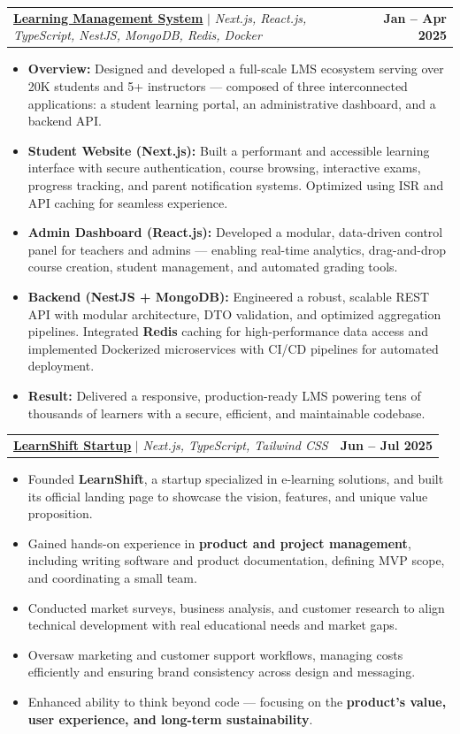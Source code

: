 \documentclass[letterpaper,11pt]{article}
\makeatletter
\newcommand{\resumeItem}[1]{
  \item\small{
    {#1 \vspace{-2pt}}
  }
}
\newcommand{\resumeProjectHeading}[2]{
    \item
    \begin{tabular*}{1.001\textwidth}{l@{\extracolsep{\fill}}r}
      \small#1 & \textbf{\small #2}\\
    \end{tabular*}\vspace{-7pt}
}
\newcommand{\resumeItemListStart}{\begin{itemize}}
\newcommand{\resumeItemListEnd}{\end{itemize}\vspace{-5pt}}
\makeatother
\begin{document}
\resumeProjectHeading
  {\href{https://heba-elsayed.com}{\underline{\textbf{Learning Management System}}} $|$ \emph{Next.js, React.js, TypeScript, NestJS, MongoDB, Redis, Docker}}{Jan -- Apr 2025}
  \resumeItemListStart
    \resumeItem{\textbf{Overview:} Designed and developed a full-scale LMS ecosystem serving over 20K students and 5+ instructors — composed of three interconnected applications: a student learning portal, an administrative dashboard, and a backend API.}
    \resumeItem{\textbf{Student Website (Next.js):} Built a performant and accessible learning interface with secure authentication, course browsing, interactive exams, progress tracking, and parent notification systems. Optimized using ISR and API caching for seamless experience.}
    \resumeItem{\textbf{Admin Dashboard (React.js):} Developed a modular, data-driven control panel for teachers and admins — enabling real-time analytics, drag-and-drop course creation, student management, and automated grading tools.}
    \resumeItem{\textbf{Backend (NestJS + MongoDB):} Engineered a robust, scalable REST API with modular architecture, DTO validation, and optimized aggregation pipelines. Integrated \textbf{Redis} caching for high-performance data access and implemented Dockerized microservices with CI/CD pipelines for automated deployment.}
    \resumeItem{\textbf{Result:} Delivered a responsive, production-ready LMS powering tens of thousands of learners with a secure, efficient, and maintainable codebase.}
  \resumeItemListEnd
  \vspace{-13pt}

\resumeProjectHeading
  {\href{https://learnshift.vercel.app/}{\underline{\textbf{LearnShift Startup}}} $|$ \emph{Next.js, TypeScript, Tailwind CSS}}{Jun -- Jul 2025}
  \resumeItemListStart
    \resumeItem{Founded \textbf{LearnShift}, a startup specialized in e-learning solutions, and built its official landing page to showcase the vision, features, and unique value proposition.}
    \resumeItem{Gained hands-on experience in \textbf{product and project management}, including writing software and product documentation, defining MVP scope, and coordinating a small team.}
    \resumeItem{Conducted market surveys, business analysis, and customer research to align technical development with real educational needs and market gaps.}
    \resumeItem{Oversaw marketing and customer support workflows, managing costs efficiently and ensuring brand consistency across design and messaging.}
    \resumeItem{Enhanced ability to think beyond code — focusing on the \textbf{product’s value, user experience, and long-term sustainability}.}
  \resumeItemListEnd
  \vspace{-13pt}
\end{document}
